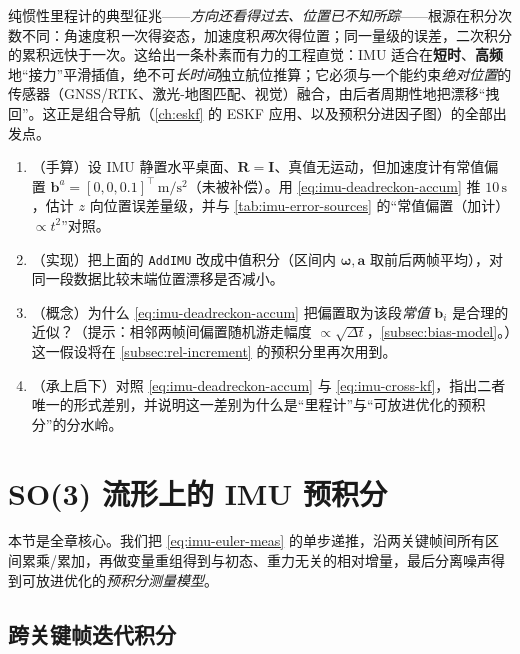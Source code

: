 \begin{insight}\label{ins:imu-deadreckon-drift}
纯惯性里程计的典型征兆——\emph{方向还看得过去、位置已不知所踪}——根源在积分次数不同：角速度积\emph{一}次得姿态，加速度积\emph{两}次得位置；同一量级的误差，二次积分的累积远快于一次。这给出一条朴素而有力的工程直觉：IMU 适合在\textbf{短时}、\textbf{高频}地“接力”平滑插值，绝不可\emph{长时间}独立航位推算；它必须与一个能约束\emph{绝对位置}的传感器（GNSS/RTK、激光-地图匹配、视觉）融合，由后者周期性地把漂移“拽回”。这正是组合导航（\cref{ch:eskf} 的 ESKF 应用、以及预积分进因子图）的全部出发点。
\end{insight}

\begin{practice}
\begin{enumerate}
  \item （手算）设 IMU 静置水平桌面、$\mathbf R=\mathbf I$、真值无运动，但加速度计有常值偏置 $\mathbf b^a=[0,0,0.1]^\top\,\mathrm{m/s^2}$（未被补偿）。用 \cref{eq:imu-deadreckon-accum} 推 $10\,\mathrm s$，估计 $z$ 向位置误差量级，并与 \cref{tab:imu-error-sources} 的“常值偏置（加计）$\propto t^2$”对照。
  \item （实现）把上面的 \texttt{AddIMU} 改成中值积分（区间内 $\boldsymbol\omega,\mathbf a$ 取前后两帧平均），对同一段数据比较末端位置漂移是否减小。
  \item （概念）为什么 \cref{eq:imu-deadreckon-accum} 把偏置取为该段\emph{常值} $\mathbf b_i$ 是合理的近似？（提示：相邻两帧间偏置随机游走幅度 $\propto\sqrt{\Delta t}$，\cref{subsec:bias-model}。）这一假设将在 \cref{subsec:rel-increment} 的预积分里再次用到。
  \item （承上启下）对照 \cref{eq:imu-deadreckon-accum} 与 \cref{eq:imu-cross-kf}，指出二者唯一的形式差别，并说明这一差别为什么是“里程计”与“可放进优化的预积分”的分水岭。
\end{enumerate}
\end{practice}

\section{SO(3) 流形上的 IMU 预积分}
\label{sec:imu-preint}

本节是全章核心。我们把 \cref{eq:imu-euler-meas} 的单步递推，沿两关键帧间所有区间累乘/累加，再做变量重组得到与初态、重力无关的相对增量，最后分离噪声得到可放进优化的\emph{预积分测量模型}。

\subsection{跨关键帧迭代积分}
\label{subsec:cross-kf}

